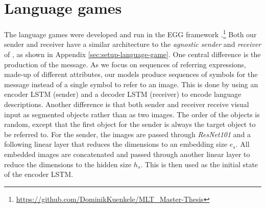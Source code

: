 \documentclass[11pt]{article}
\begin{document}
\section{Language games}
The language games were developed and run in the EGG framework \citep{Kharitonov2019}.\footnote{\href{https://github.com/DominikKuenkele/MLT\_Master-Thesis}{https://github.com/DominikKuenkele/MLT\_Master-Thesis}}
Both our sender and receiver have a similar architecture to the \emph{agnostic sender} and \emph{receiver} of \citep{Lazaridou2016}, as shown in Appendix \ref*{sec:setup-language-game}.
One central difference is the production of the message.
As we focus on sequences of referring expressions, made-up of different attributes, our models produce sequences of symbols for the message %
instead of a single symbol to refer to an image. %
This is done by using an encoder LSTM (sender) and a decoder LSTM (receiver) to encode language descriptions.
%
%
%
Another difference is that both sender and receiver receive visual input as segmented objects rather than as two images.
The order of the objects is random, except that the first object for the sender is always the target object to be referred to.
For the sender, the images are passed through \emph{ResNet101} \citep{He2016} and a following linear layer that reduces the dimensions to an embedding size $e_s$.
All embedded images are concatenated and passed through another linear layer to reduce the dimensions to the hidden size $h_s$.
This is then used as the initial state of the encoder LSTM.
\end{document}
